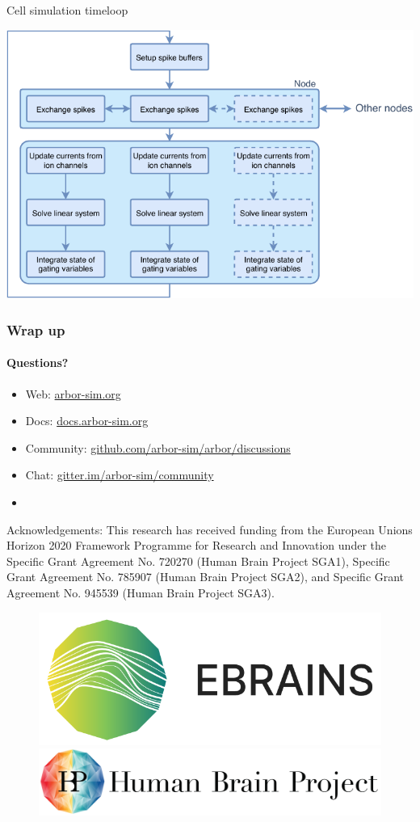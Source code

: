 \documentclass[t]{beamer}
\begin{document}
  \begin{frame}{Cell simulation timeloop}
    \begin{center}
      \includegraphics[height=.75\textheight]{timeloop.pdf}
    \end{center}
  \end{frame}


\begin{frame}
    \frametitle{Wrap up}
    \framesubtitle{Questions?}
    \begin{itemize}
        \item Web: \url{arbor-sim.org}
        \item Docs: \url{docs.arbor-sim.org}
        \item Community: \url{github.com/arbor-sim/arbor/discussions}
        \item Chat: \url{gitter.im/arbor-sim/community}
        \item[]
    \end{itemize}

    { \scriptsize Acknowledgements: This research has received funding from the European Unions
    Horizon 2020 Framework Programme for Research and
    Innovation under the Specific Grant Agreement No. 720270
    (Human Brain Project SGA1), Specific Grant Agreement No.
    785907 (Human Brain Project SGA2), and Specific Grant
    Agreement No. 945539 (Human Brain Project SGA3). }
    \newline
    \begin{figure}[h]
        \begin{center}
            \includegraphics[width=0.2\linewidth]{ebrains_logo.png}
            \hspace{2em}
            \includegraphics[width=0.4\linewidth]{HBP_logo.jpg}
        \end{center}
    \end{figure}
\end{frame}
\end{document}
